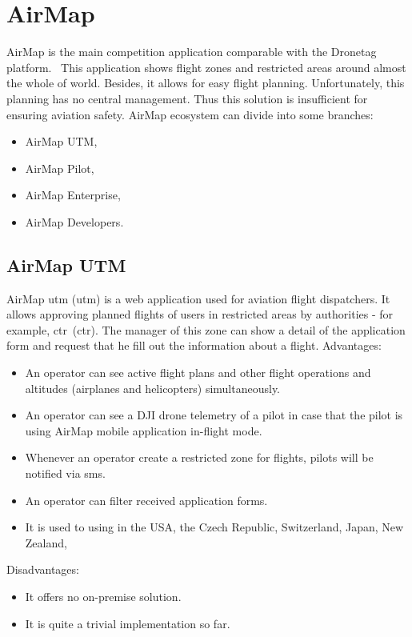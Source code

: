 \section{AirMap}\label{sec:airmap}
AirMap is the main competition application comparable with the Dronetag platform.~\cite{airMap}
This application shows flight zones and restricted areas around almost the whole of world.
Besides, it allows for easy flight planning.
Unfortunately, this planning has no central management.
Thus this solution is insufficient for ensuring aviation safety.
AirMap ecosystem can divide into some branches:
\begin{itemize}
    \item AirMap UTM,
    \item AirMap Pilot,
    \item AirMap Enterprise,
    \item AirMap Developers.
\end{itemize}


\subsection{AirMap UTM}\label{subsec:airmap-utm}
AirMap \acrshort{utm} (\acrlong{utm}) is a web application used for aviation flight dispatchers.
It allows approving planned flights of users in restricted areas by authorities - for example, \acrshort{ctr}~(\acrlong{ctr}).
The manager of this zone can show a detail of the application form and request that he fill out the information about a flight.
\newline
\newline
\newline
\newline
Advantages:
\begin{itemize}
    \item An operator can see active flight plans and other flight operations and altitudes (airplanes and helicopters) simultaneously.
    \item An operator can see a DJI drone telemetry of a pilot in case that the pilot is using AirMap mobile application in-flight mode.
    \item Whenever an operator create a restricted zone for flights, pilots will be notified via \acrshort{sms}.
    \item An operator can filter received application forms.
    \item It is used to using in the USA, the Czech Republic, Switzerland, Japan, New Zealand,~\textellipsis
\end{itemize}
Disadvantages:
\begin{itemize}
    \item It offers no on-premise solution.
    \item It is quite a trivial implementation so far.
\end{itemize}



